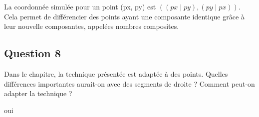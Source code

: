 \documentclass{article}
\begin{document}
\bigskip

La coordonnée simulée pour un point (px, py) est $((px \mid py), (py \mid px)).$ 
Cela permet de différencier des points ayant une composante identique grâce à leur nouvelle composantes, appelées nombres composites. 


\subsection{Question 8} Dans le chapitre, la technique présentée est adaptée à des points. 
Quelles différences importantes aurait-on avec des segments de droite ? Comment peut-on adapter la technique ?

\bigskip

oui %
\end{document}
